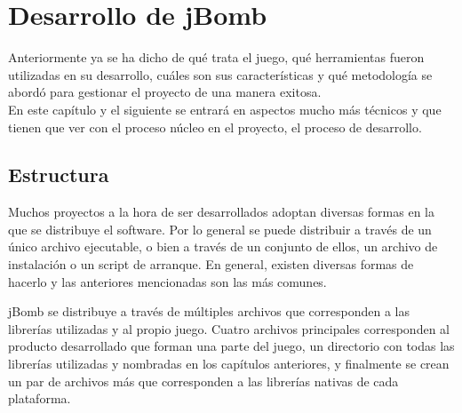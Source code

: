 \documentclass[a4paper,12pt,openany,oneside]{book}
\begin{document}
\chapter{Desarrollo de jBomb}
Anteriormente ya se ha dicho de qué trata el juego, qué herramientas fueron utilizadas en su desarrollo, cuáles son sus características y qué metodología se abordó para gestionar el proyecto de una manera exitosa.\\
En este capítulo y el siguiente se entrará en aspectos mucho más técnicos y que tienen que ver con el proceso núcleo en el proyecto, el proceso de desarrollo.

\section{Estructura}
Muchos proyectos a la hora de ser desarrollados adoptan diversas formas en la que se distribuye el software. Por lo general se puede distribuir a través de un único archivo ejecutable, o bien a través de un conjunto de ellos, un archivo de instalación o un script de arranque. En general, existen diversas formas de hacerlo y las anteriores mencionadas son las más comunes. 

jBomb se distribuye a través de múltiples archivos que corresponden a las librerías utilizadas y al propio juego. Cuatro archivos principales corresponden al producto desarrollado que forman una parte del juego, un directorio con todas las librerías utilizadas y nombradas en los capítulos anteriores, y finalmente se crean un par de archivos más que corresponden a las librerías nativas de cada plataforma.
\end{document}
